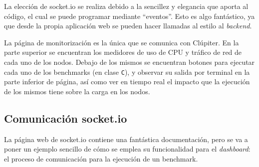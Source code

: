 La elección de socket.io se realiza debido a la sencillez y elegancia que aporta al código, el cual se puede programar mediante ``eventos''. Esto es algo fantástico, ya que desde la propia aplicación web se pueden hacer llamadas al estilo al \textit{backend}.

La página de monitorización es la única que se comunica con Clúpiter. En la parte superior se encuentran los medidores de uso de CPU y tráfico de red de cada uno de los nodos. Debajo de los mismos se encuentran botones para ejecutar cada uno de los benchmarks (en clase \texttt{C}), y observar su salida por terminal en la parte inferior de página, así como ver en tiempo real el impacto que la ejecución de los mismos tiene sobre la carga en los nodos.

\subsection{Comunicación socket.io}
La página web de socket.io contiene una fantástica documentación, pero se va a poner un ejemplo sencillo de cómo se emplea su funcionalidad para el \textit{dashboard}: el proceso de comunicación para la ejecución de un benchmark.

